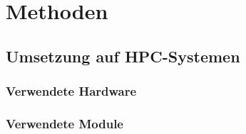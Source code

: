 \section{Methoden}
\label{methoden}

\subsection{Umsetzung auf HPC-Systemen}
\label{methoden:systeme}

\subsubsection{Verwendete Hardware}
\label{methoden:systeme:hardware}

\subsubsection{Verwendete Module}
\label{methoden:systememodule}

